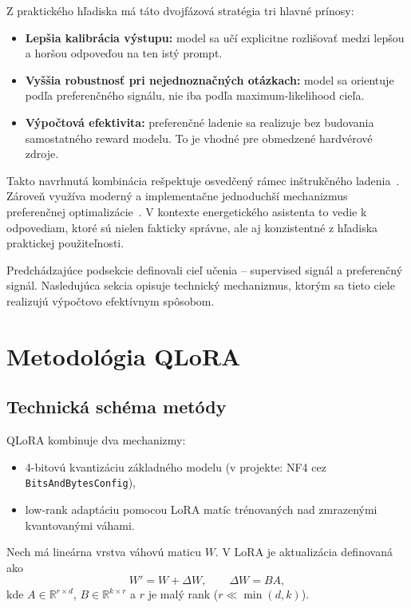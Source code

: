 Z praktického hľadiska má táto dvojfázová stratégia tri hlavné prínosy:
\begin{itemize}
    \item \textbf{Lepšia kalibrácia výstupu:} model sa učí explicitne rozlišovať medzi lepšou a horšou odpoveďou na ten istý prompt.
    \item \textbf{Vyššia robustnosť pri nejednoznačných otázkach:} model sa orientuje podľa preferenčného signálu, nie iba podľa maximum-likelihood cieľa.
    \item \textbf{Výpočtová efektivita:} preferenčné ladenie sa realizuje bez budovania samostatného reward modelu. To je vhodné pre obmedzené hardvérové zdroje.
\end{itemize}

Takto navrhnutá kombinácia rešpektuje osvedčený rámec inštrukčného ladenia~\cite{Ouyang2022InstructGPT,Chung2022ScalingInstruction}. Zároveň využíva moderný a implementačne jednoduchší mechanizmus preferenčnej optimalizácie~\cite{Rafailov2023DPO}. V kontexte energetického asistenta to vedie k odpovediam, ktoré sú nielen fakticky správne, ale aj konzistentné z hľadiska praktickej použiteľnosti.

Predchádzajúce podsekcie definovali cieľ učenia -- supervised signál a preferenčný signál. Nasledujúca sekcia opisuje technický mechanizmus, ktorým sa tieto ciele realizujú výpočtovo efektívnym spôsobom.

\section{Metodológia QLoRA}

\subsection{Technická schéma metódy}

QLoRA kombinuje dva mechanizmy:
\begin{itemize}
    \item 4-bitovú kvantizáciu základného modelu (v projekte: NF4 cez \texttt{BitsAndBytesConfig}),
    \item low-rank adaptáciu pomocou LoRA matíc trénovaných nad zmrazenými kvantovanými váhami.
\end{itemize}

Nech má lineárna vrstva váhovú maticu $W$. V LoRA je aktualizácia definovaná ako
\begin{equation}
    W' = W + \Delta W, \qquad \Delta W = BA,
\end{equation}
kde $A \in \mathbb{R}^{r \times d}$, $B \in \mathbb{R}^{k \times r}$ a $r$ je malý rank ($r \ll \min(d,k)$).

